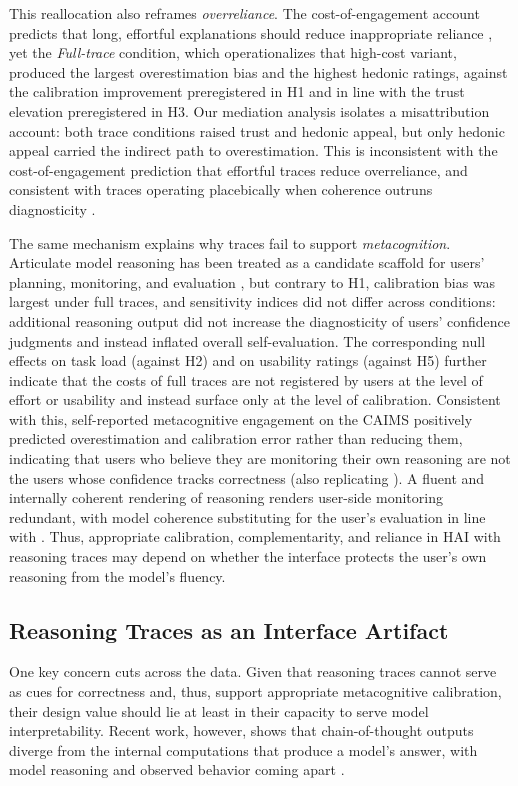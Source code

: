 \documentclass[manuscript, anonymous=false,authorversion,review=false]{acmart}
\begin{document}
This reallocation also reframes \textit{overreliance}. The cost-of-engagement account predicts that long, effortful explanations should reduce inappropriate reliance \cite{vasconcelos2023explanations}, yet the \textit{Full-trace} condition, which operationalizes that high-cost variant, produced the largest overestimation bias and the highest hedonic ratings, against the calibration improvement preregistered in H1 and in line with the trust elevation preregistered in H3. Our mediation analysis isolates a misattribution account: both trace conditions raised trust and hedonic appeal, but only hedonic appeal carried the indirect path to overestimation. This is inconsistent with the cost-of-engagement prediction \cite{vasconcelos2023explanations} that effortful traces reduce overreliance, and consistent with traces operating placebically when coherence outruns diagnosticity \cite{eiband2019impact}. 

The same mechanism explains why traces fail to support \textit{metacognition}. Articulate model reasoning has been treated as a candidate scaffold for users' planning, monitoring, and evaluation \cite{FERNANDES2026108779}, but contrary to H1, calibration bias was largest under full traces, and sensitivity indices did not differ across conditions: additional reasoning output did not increase the diagnosticity of users' confidence judgments and instead inflated overall self-evaluation. The corresponding null effects on task load (against H2) and on usability ratings (against H5) further indicate that the costs of full traces are not registered by users at the level of effort or usability and instead surface only at the level of calibration. Consistent with this, self-reported metacognitive engagement on the CAIMS positively predicted overestimation and calibration error rather than reducing them, indicating that users who believe they are monitoring their own reasoning are not the users whose confidence tracks correctness (also replicating \cite{FERNANDES2026108779}). A fluent and internally coherent rendering of reasoning renders user-side monitoring redundant, with model coherence substituting for the user's evaluation in line with \citet{alter2009uniting}. Thus, appropriate calibration, complementarity, and reliance in HAI with reasoning traces may depend on whether the interface protects the user's own reasoning from the model's fluency.



\subsection{Reasoning Traces as an Interface Artifact}
One key concern cuts across the data. Given that reasoning traces cannot serve as cues for correctness and, thus, support appropriate metacognitive calibration, their design value should lie at least in their capacity to serve model interpretability. Recent work, however, shows that chain-of-thought outputs diverge from the internal computations that produce a model's answer, with model reasoning and observed behavior coming apart \cite{10.5555/3666122.3669397,lindsey2025biology, barez2025chain}. 
\end{document}
